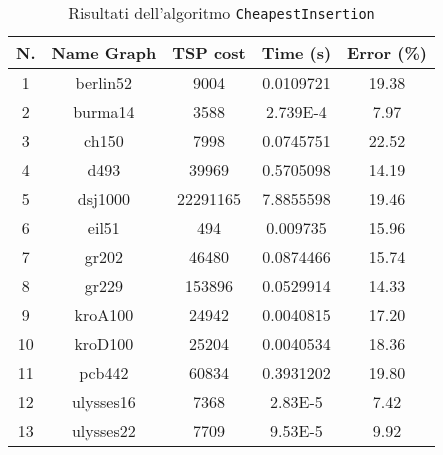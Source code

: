\begin{table}[H]
	\centering
	\begin{tabular}{|c|c|c|c|c|}
		\hline
		\textbf{N.} & \textbf{Name Graph} & \textbf{TSP cost} & \textbf{Time (s)} & \textbf{Error (\%)}\\ 
		\hline
		1 & berlin52 & 9004 & 0.0109721 & 19.38\\
		\hline
		2 & burma14 & 3588 & 2.739E-4 & 7.97\\
		\hline
		3 & ch150 & 7998 & 0.0745751 & 22.52\\
		\hline
		4 & d493 & 39969 & 0.5705098 & 14.19\\
		\hline
		5 & dsj1000 & 22291165 & 7.8855598 & 19.46\\
		\hline
		6 & eil51 & 494 & 0.009735 & 15.96\\
		\hline
		7 & gr202 & 46480 & 0.0874466 & 15.74\\
		\hline
		8 & gr229 & 153896 & 0.0529914 & 14.33\\
		\hline
		9 & kroA100 & 24942 & 0.0040815 & 17.20\\
		\hline
		10 & kroD100 & 25204 & 0.0040534 & 18.36\\
		\hline
		11 & pcb442 & 60834 & 0.3931202 & 19.80\\
		\hline
		12 & ulysses16 & 7368 & 2.83E-5 & 7.42\\
		\hline
		13 & ulysses22 & 7709 & 9.53E-5 & 9.92\\
		\hline
	\end{tabular}
	\caption{Risultati dell'algoritmo \texttt{CheapestInsertion}}
\end{table}

